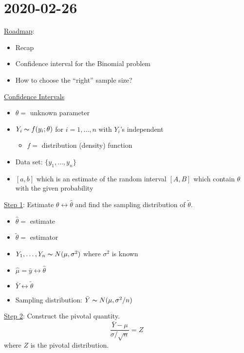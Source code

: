 \section{2020-02-26}
\underline{Roadmap}:
\begin{itemize}
    \item Recap
    \item Confidence interval for the Binomial problem
    \item How to choose the ``right'' sample size?
\end{itemize}
\underline{Confidence Intervals}
\begin{itemize}
    \item $ \theta= $ unknown parameter
    \item $ Y_i \thicksim f(y_i;\theta) $ for $ i=1,\ldots ,n $ with $ Y_i $'s independent
          \begin{itemize}
              \item $ f= $ distribution (density) function
          \end{itemize}
    \item Data set: $ \{y_1,\ldots ,y_n\} $
    \item $ [a,b] $ which is an estimate of the random interval $ [A,B] $
          which contain $ \theta $ with the given probability
\end{itemize}

\underline{Step 1}: Estimate $ \theta \longleftrightarrow \hat{\theta} $ and
find the sampling distribution of $ \tilde{\theta} $.
\begin{itemize}
    \item $ \hat{\theta}= $ estimate
    \item $ \tilde{\theta}= $ estimator
    \item $ Y_1,\ldots ,Y_n \thicksim N(\mu,\sigma^2) $ where $ \sigma^2 $ is known
    \item $ \hat{\mu}=\bar{y} \longleftrightarrow \hat{\theta} $
    \item $ \bar{Y} \longleftrightarrow \tilde{\theta} $
    \item Sampling distribution: $ \bar{Y}\thicksim N(\mu,\sigma^2/n) $
\end{itemize}
\underline{Step 2}: Construct the pivotal quantity.
\[ \frac{\bar{Y}-\mu}{\sigma/\sqrt{n}}=Z \]
where $ Z $ is the pivotal distribution.

